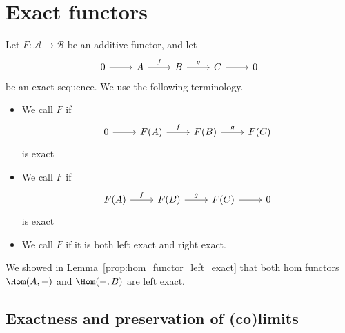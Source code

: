 \documentclass[main.tex]{subfiles}
\begin{document}
\section{Exact functors}
\label{sec:exact_functors}

\begin{definition}
  \label{def:exact_functor}
  Let $F\colon \mathcal{A} \to \mathcal{B}$ be an additive functor, and let
  \begin{equation*}
    \begin{tikzcd}
      0
      \arrow[r]
      & A
      \arrow[r, "f"]
      & B
      \arrow[r, "g"]
      & C
      \arrow[r]
      & 0
    \end{tikzcd}
  \end{equation*}
  be an exact sequence. We use the following terminology.
  \begin{itemize}
    \item We call $F$  if
      \begin{equation*}
        \begin{tikzcd}
          0
          \arrow[r]
          & F(A)
          \arrow[r, "f"]
          & F(B)
          \arrow[r, "g"]
          & F(C)
        \end{tikzcd}
      \end{equation*}
      is exact

    \item We call $F$  if
      \begin{equation*}
        \begin{tikzcd}
          F(A)
          \arrow[r, "f"]
          & F(B)
          \arrow[r, "g"]
          & F(C)
          \arrow[r]
          & 0
        \end{tikzcd}
      \end{equation*}
      is exact

    \item We call $F$  if it is both left exact and right exact.
  \end{itemize}
\end{definition}

\begin{example}
  We showed in \hyperref[prop:hom_functor_left_exact]{Lemma~\ref*{prop:hom_functor_left_exact}} that both hom functors $\Hom(A, -)$ and $\Hom(-, B)$ are left exact.
\end{example}


\subsection{Exactness and preservation of (co)limits}
\label{ssc:exactness_and_preservation_of_co_limits}
\end{document}

